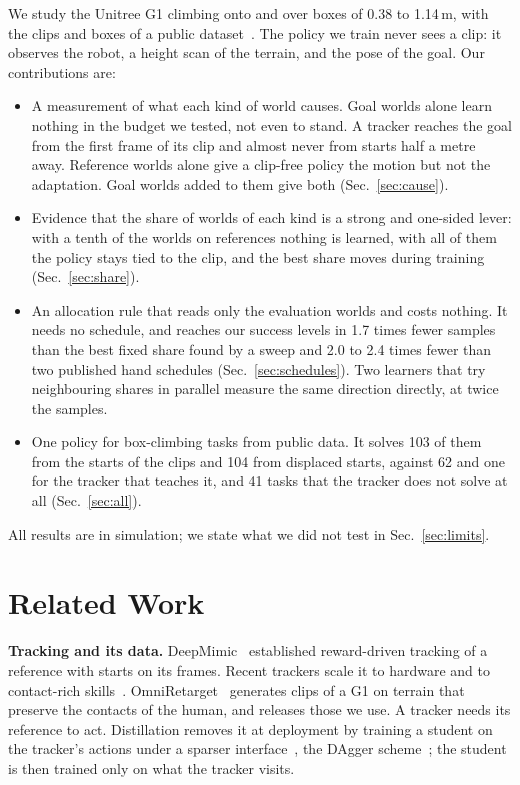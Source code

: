 We study the Unitree G1 climbing onto and over boxes of 0.38 to 1.14\,m, with the clips and boxes of a public dataset~\cite{omniretarget}. The policy we train never sees a clip: it observes the robot, a height scan of the terrain, and the pose of the goal. Our contributions are:
\begin{itemize}
\item A measurement of what each kind of world causes. Goal worlds alone learn nothing in the budget we tested, not even to stand. A tracker reaches the goal from the first frame of its clip and almost never from starts half a metre away. Reference worlds alone give a clip-free policy the motion but not the adaptation. Goal worlds added to them give both (Sec.~\ref{sec:cause}).
\item Evidence that the share of worlds of each kind is a strong and one-sided lever: with a tenth of the worlds on references nothing is learned, with all of them the policy stays tied to the clip, and the best share moves during training (Sec.~\ref{sec:share}).
\item An allocation rule that reads only the evaluation worlds and costs nothing. It needs no schedule, and reaches our success levels in 1.7 times fewer samples than the best fixed share found by a sweep and 2.0 to 2.4 times fewer than two published hand schedules (Sec.~\ref{sec:schedules}). Two learners that try neighbouring shares in parallel measure the same direction directly, at twice the samples.
\item One policy for \tasksall{} box-climbing tasks from public data. It solves 103 of them from the starts of the clips and 104 from displaced starts, against 62 and one for the tracker that teaches it, and 41 tasks that the tracker does not solve at all (Sec.~\ref{sec:all}).
\end{itemize}
All results are in simulation; we state what we did not test in Sec.~\ref{sec:limits}.

\section{Related Work}

\textbf{Tracking and its data.} DeepMimic~\cite{deepmimic} established reward-driven tracking of a reference with starts on its frames. Recent trackers scale it to hardware and to contact-rich skills~\cite{beyondmimic,zest}. OmniRetarget~\cite{omniretarget} generates clips of a G1 on terrain that preserve the contacts of the human, and releases those we use. A tracker needs its reference to act. Distillation removes it at deployment by training a student on the tracker's actions under a sparser interface~\cite{maskedmimic,hover}, the DAgger scheme~\cite{dagger}; the student is then trained only on what the tracker visits.

